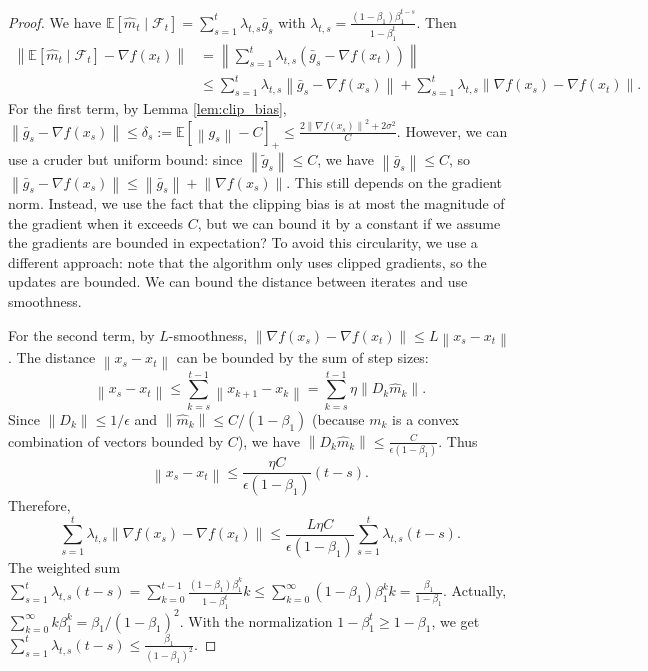\documentclass{article}
\newcommand{\E}{\mathbb{E}}
\newcommand{\norm}[1]{\left\| #1 \right\|}
\begin{document}
\begin{proof}
    We have $\E[\hat{m}_t \mid \mathcal{F}_t] = \sum_{s=1}^t \lambda_{t,s} \bar{g}_s$ with $\lambda_{t,s} = \frac{(1-\beta_1)\beta_1^{t-s}}{1-\beta_1^t}$. Then
    \begin{align*}
        \norm{\E[\hat{m}_t \mid \mathcal{F}_t] - \nabla f(x_t)}
        &= \norm{\sum_{s=1}^t \lambda_{t,s} (\bar{g}_s - \nabla f(x_t))} \\
        &\le \sum_{s=1}^t \lambda_{t,s} \norm{\bar{g}_s - \nabla f(x_s)} + \sum_{s=1}^t \lambda_{t,s} \norm{\nabla f(x_s) - \nabla f(x_t)}.
    \end{align*}
    For the first term, by Lemma \ref{lem:clip_bias}, $\norm{\bar{g}_s - \nabla f(x_s)} \le \delta_s := \E[\norm{g_s}-C]_+ \le \frac{2\norm{\nabla f(x_s)}^2 + 2\sigma^2}{C}$. However, we can use a cruder but uniform bound: since $\norm{\tilde{g}_s} \le C$, we have $\norm{\bar{g}_s} \le C$, so $\norm{\bar{g}_s - \nabla f(x_s)} \le \norm{\bar{g}_s} + \norm{\nabla f(x_s)}$. This still depends on the gradient norm. Instead, we use the fact that the clipping bias is at most the magnitude of the gradient when it exceeds $C$, but we can bound it by a constant if we assume the gradients are bounded in expectation? To avoid this circularity, we use a different approach: note that the algorithm only uses clipped gradients, so the updates are bounded. We can bound the distance between iterates and use smoothness.

    For the second term, by $L$-smoothness, $\norm{\nabla f(x_s) - \nabla f(x_t)} \le L \norm{x_s - x_t}$. The distance $\norm{x_s - x_t}$ can be bounded by the sum of step sizes:
    \[
        \norm{x_s - x_t} \le \sum_{k=s}^{t-1} \norm{x_{k+1} - x_k} = \sum_{k=s}^{t-1} \eta \norm{D_k \hat{m}_k}.
    \]
    Since $\norm{D_k} \le 1/\epsilon$ and $\norm{\hat{m}_k} \le C/(1-\beta_1)$ (because $m_k$ is a convex combination of vectors bounded by $C$), we have $\norm{D_k \hat{m}_k} \le \frac{C}{\epsilon(1-\beta_1)}$. Thus
    \[
        \norm{x_s - x_t} \le \frac{\eta C}{\epsilon(1-\beta_1)} (t-s).
    \]
    Therefore,
    \[
        \sum_{s=1}^t \lambda_{t,s} \norm{\nabla f(x_s) - \nabla f(x_t)} \le \frac{L \eta C}{\epsilon(1-\beta_1)} \sum_{s=1}^t \lambda_{t,s} (t-s).
    \]
    The weighted sum $\sum_{s=1}^t \lambda_{t,s} (t-s) = \sum_{k=0}^{t-1} \frac{(1-\beta_1)\beta_1^k}{1-\beta_1^t} k \le \sum_{k=0}^\infty (1-\beta_1)\beta_1^k k = \frac{\beta_1}{1-\beta_1}$.
    Actually, $\sum_{k=0}^\infty k \beta_1^k = \beta_1/(1-\beta_1)^2$. With the normalization $1-\beta_1^t \ge 1-\beta_1$, we get $\sum_{s=1}^t \lambda_{t,s} (t-s) \le \frac{\beta_1}{(1-\beta_1)^2}$.


\end{proof}
\end{document}
